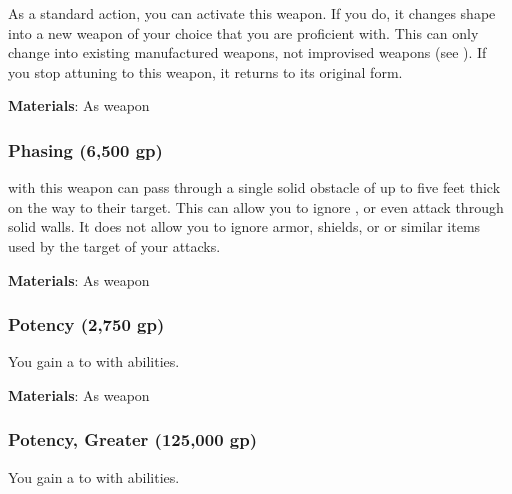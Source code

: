 As a standard action, you can activate this weapon.
If you do, it changes shape into a new weapon of your choice that you are proficient with.
This can only change into existing manufactured weapons, not improvised weapons (see ).
If you stop attuning to this weapon, it returns to its original form.



\vspace{0.25em}
\textbf{Materials}: As weapon


\lowercase{\hypertarget{item:Phasing}{}}\label{item:Phasing}
\hypertarget{item:Phasing}{\subsubsection{Phasing\hfill{} (6,500 gp)}}

 with this weapon can pass through a single solid obstacle of up to five feet thick on the way to their target.
This can allow you to ignore , or even attack through solid walls.
It does not allow you to ignore armor, shields, or or similar items used by the target of your attacks.



\vspace{0.25em}
\textbf{Materials}: As weapon


\lowercase{\hypertarget{item:Potency}{}}\label{item:Potency}
\hypertarget{item:Potency}{\subsubsection{Potency\hfill{} (2,750 gp)}}

You gain a   to  with  abilities.



\vspace{0.25em}
\textbf{Materials}: As weapon


\lowercase{\hypertarget{item:Potency, Greater}{}}\label{item:Potency, Greater}
\hypertarget{item:Potency, Greater}{\subsubsection{Potency, Greater\hfill{} (125,000 gp)}}

You gain a   to  with  abilities.



